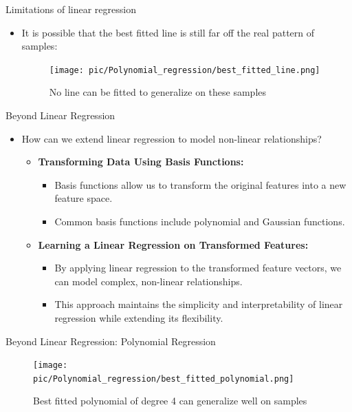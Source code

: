 \documentclass[serif, aspectratio=169]{beamer}
\begin{document}
\begin{frame}{Limitations of linear regression}
    \begin{itemize}
        \item It is possible that the best fitted line is still far off the real pattern of samples:
        \begin{figure}[h]
            \centering
            \texttt{[image: pic/Polynomial\_regression/best\_fitted\_line.png]}
            \caption{No line can be fitted to generalize on these samples}
        \end{figure}
    \end{itemize}
\end{frame}


\begin{frame}{Beyond Linear Regression}
    \begin{itemize}
        \item How can we extend linear regression to model non-linear relationships?
        \begin{itemize}
            \item \textbf{Transforming Data Using Basis Functions:}
            \begin{itemize}
                \item Basis functions allow us to transform the original features into a new feature space.
                \item Common basis functions include polynomial and Gaussian functions.
            \end{itemize}
            \item \textbf{Learning a Linear Regression on Transformed Features:}
            \begin{itemize}
                \item By applying linear regression to the transformed feature vectors, we can model complex, non-linear relationships.
                \item This approach maintains the simplicity and interpretability of linear regression while extending its flexibility.
            \end{itemize}
        \end{itemize}
    \end{itemize}
\end{frame}

\begin{frame}{Beyond Linear Regression: Polynomial Regression}
    \begin{figure}[h]
        \centering
        \texttt{[image: pic/Polynomial\_regression/best\_fitted\_polynomial.png]}
        \caption{Best fitted polynomial of degree 4 can generalize well on samples}
    \end{figure}
\end{frame}
\end{document}
